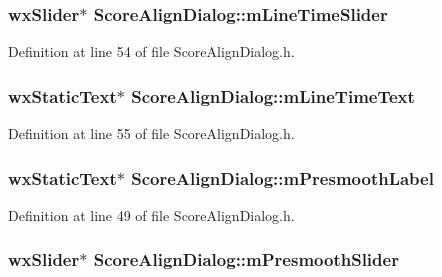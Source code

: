\subsubsection[{\texorpdfstring{m\+Line\+Time\+Slider}{mLineTimeSlider}}]{\setlength{\rightskip}{0pt plus 5cm}wx\+Slider$\ast$ Score\+Align\+Dialog\+::m\+Line\+Time\+Slider}\hypertarget{class_score_align_dialog_a00f27cc2505fe7719a74ab358b00ddd5}{}\label{class_score_align_dialog_a00f27cc2505fe7719a74ab358b00ddd5}


Definition at line 54 of file Score\+Align\+Dialog.\+h.

\subsubsection[{\texorpdfstring{m\+Line\+Time\+Text}{mLineTimeText}}]{\setlength{\rightskip}{0pt plus 5cm}wx\+Static\+Text$\ast$ Score\+Align\+Dialog\+::m\+Line\+Time\+Text}\hypertarget{class_score_align_dialog_a03ed7b14d547d1300f5979166d9fe68b}{}\label{class_score_align_dialog_a03ed7b14d547d1300f5979166d9fe68b}


Definition at line 55 of file Score\+Align\+Dialog.\+h.

\subsubsection[{\texorpdfstring{m\+Presmooth\+Label}{mPresmoothLabel}}]{\setlength{\rightskip}{0pt plus 5cm}wx\+Static\+Text$\ast$ Score\+Align\+Dialog\+::m\+Presmooth\+Label}\hypertarget{class_score_align_dialog_a09552afb3fa1d2b012f04783fc220cec}{}\label{class_score_align_dialog_a09552afb3fa1d2b012f04783fc220cec}


Definition at line 49 of file Score\+Align\+Dialog.\+h.

\subsubsection[{\texorpdfstring{m\+Presmooth\+Slider}{mPresmoothSlider}}]{\setlength{\rightskip}{0pt plus 5cm}wx\+Slider$\ast$ Score\+Align\+Dialog\+::m\+Presmooth\+Slider}\hypertarget{class_score_align_dialog_a18099a52f4dc76df66377b8cebc3bff1}{}\label{class_score_align_dialog_a18099a52f4dc76df66377b8cebc3bff1}


